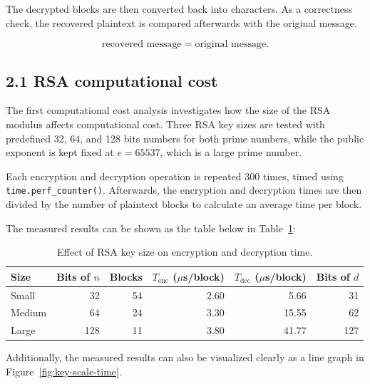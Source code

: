 \documentclass[11pt,a4paper]{article}
\begin{document}
The decrypted blocks are then converted back into characters. As a correctness check, the recovered plaintext is compared afterwards with the original message.

$$
\text{recovered message}=\text{original message}.
$$

\subsection*{2.1 RSA computational cost}

The first computational cost analysis investigates how the size of the RSA modulus affects computational cost. Three RSA key sizes are tested with predefined 32, 64, and 128 bits numbers for both prime numbers, while the public exponent is kept fixed at $e=65537$, which is a large prime number.

Each encryption and decryption operation is repeated 300 times, timed using \texttt{time.perf\_counter()}. Afterwards, the encryption and decryption times are then divided by the number of plaintext blocks to calculate an average time per block.

The measured results can be shown as the table below in Table~\ref{tab:key-scale}:

\begin{table}[ht]
    \centering
    \caption{Effect of RSA key size on encryption and decryption time.}
    \label{tab:key-scale}
    \begin{tabular}{lrrrrr}
        \toprule
        Size & Bits of $n$ & Blocks &
        $T_{\mathrm{enc}}$ ($\mu$s/block) &
        $T_{\mathrm{dec}}$ ($\mu$s/block) &
        Bits of $d$ \\
        \midrule
        Small  & 32  & 54 & 2.60 & 5.66  & 31  \\
        Medium & 64  & 24 & 3.30 & 15.55 & 62  \\
        Large  & 128 & 11 & 3.80 & 41.77 & 127 \\
        \bottomrule
    \end{tabular}
\end{table}

Additionally, the measured results can also be visualized clearly as a line graph in Figure~\ref{fig:key-scale-time}.
\end{document}
